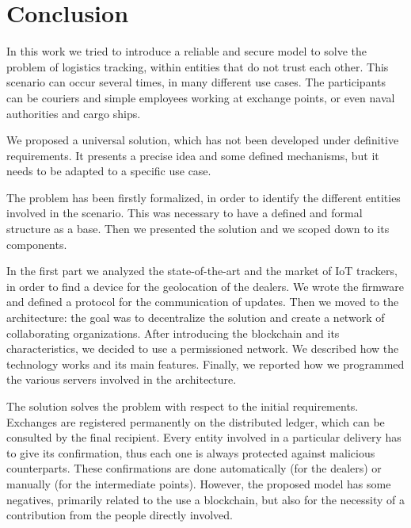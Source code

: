 \newpage
\chapter{Conclusion}
\label{cha:conclusion}

In this work we tried to introduce a reliable and secure model to solve the problem of logistics tracking, within entities that do not trust each other. This scenario can occur several times, in many different use cases. The participants can be couriers and simple employees working at exchange points, or even naval authorities and cargo ships. 

We proposed a universal solution, which has not been developed under definitive requirements. It presents a precise idea and some defined mechanisms, but it needs to be adapted to a specific use case.

The problem has been firstly formalized, in order to identify the different entities involved in the scenario. This was necessary to have a defined and formal structure as a base. Then we presented the solution and we scoped down to its components.

In the first part we analyzed the state-of-the-art and the market of IoT trackers, in order to find a device for the geolocation of the dealers. We wrote the firmware and defined a protocol for the communication of updates. Then we moved to the architecture: the goal was to decentralize the solution and create a network of collaborating organizations. After introducing the blockchain and its characteristics, we decided to use a permissioned network. We described how the technology works and its main features. Finally, we reported how we programmed the various servers involved in the architecture.

The solution solves the problem with respect to the initial requirements. Exchanges are registered permanently on the distributed ledger, which can be consulted by the final recipient. Every entity involved in a particular delivery has to give its confirmation, thus each one is always protected against malicious counterparts. These confirmations are done automatically (for the dealers) or manually (for the intermediate points). However, the proposed model has some negatives, primarily related to the use a blockchain, but also for the necessity of a contribution from the people directly involved.

